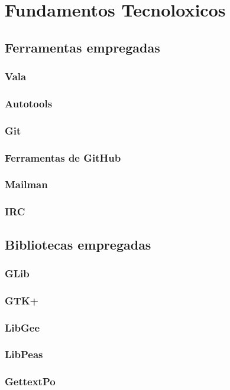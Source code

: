 \chapter[Fundamentos Tecnoloxicos]{Fundamentos Tecnoloxicos}

\section{Ferramentas empregadas}

 \subsection{Vala}
 \subsection{Autotools}
 \subsection{Git}
 \subsection{Ferramentas de GitHub}
 \subsection{Mailman}
 \subsection{IRC}

\section{Bibliotecas empregadas}

\subsection{GLib}
\subsection{GTK+}
\subsection{LibGee}
\subsection{LibPeas}
\subsection{GettextPo}

